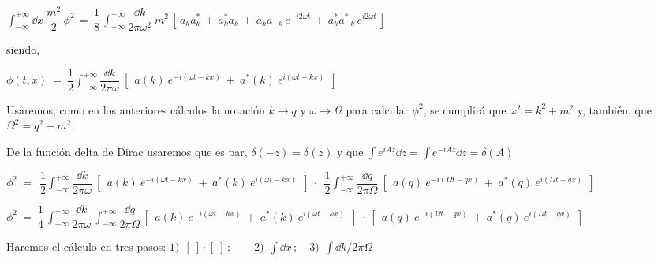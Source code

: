 {\begin{ejercicio}
\begin{adjustwidth}{30pt}{20pt}
$\displaystyle \int_{-\infty}^{+\infty} \dd x \ \dfrac {m^2} 2 \, \phi^2 \, = \,
\dfrac 1 8 \, \int_{-\infty}^{+\infty} \dfrac{\dd k}{2\pi \omega^2}\ m^2 \, 
\left[\,
a_ka^*_k \, + \, a^*_k a_k \, + \, a_ka_{-k}\, e^{-i2\omega t}\, + \, a^*_ka^*_{-k}\, e^{i2\omega t}
\, \right]$

siendo,

$\displaystyle \phi(t,x) \ = \ \dfrac 1 2   \int_{-\infty}^{+\infty} 
\dfrac{\dd k}{2\pi \omega} \ \left[ \ 
\  a(k)\ e^{-i(\omega t-kx)} \ + \ a^*(k)\ e^{i(\omega t-kx)} \  \ \right] $
\vspace{2mm}
\end{adjustwidth}
\end{ejercicio}

\vspace{5mm}
\color{MidnightBlue}

Usaremos, como en los anteriores cálculos la notación $k \to q$ y $\omega \to \Omega$ para calcular $\phi^2$, se cumplirá que $\omega^2=k^2+m^2$ y, también, que  $\Omega^2=q^2+m^2$. 

De la función delta de Dirac usaremos que es par, $\delta(-z)=\delta(z)$ y que $\displaystyle \int e^{iAz}\dd z=\int e^{-iAz}\dd z=\delta(A)$

\begin{footnotesize}
$\displaystyle \phi^2 \ = \ \ \dfrac 1 2   \int_{-\infty}^{+\infty} 
\dfrac{\dd k}{2\pi \omega} \ \left[ \ 
\  a(k)\ e^{-i(\omega t-kx)} \ + \ a^*(k)\ e^{i(\omega t-kx)} \  \ \right] \ \cdot \ 
\ \dfrac 1 2   \int_{-\infty}^{+\infty} 
\dfrac{\dd q}{2\pi \Omega} \ \left[ \ 
\  a(q)\ e^{-i(\Omega t-qx)} \ + \ a^*(q)\ e^{i(\Omega t-qx)} \  \ \right]$

$\displaystyle  \phi^2 \ = \ \dfrac 1 4\, 
\int_{-\infty}^{+\infty} \dfrac{\dd k}{2\pi \omega} \,  \int_{-\infty}^{+\infty}  \dfrac{\dd q}{2\pi \Omega} \, 
\left[ \ 
\  a(k)\ e^{-i(\omega t-kx)} \ + \ a^*(k)\ e^{i(\omega t-kx)} \  \ \right] \ \cdot \  \left[ \ 
\  a(q)\ e^{-i(\Omega t-qx)} \ + \ a^*(q)\ e^{i(\Omega t-qx)} \  \ \right]$
\end{footnotesize}
 
\vspace{5mm}
Haremos el cálculo en tres pasos: $1)\ \ [\ ]\cdot [\ ]\,;\qquad 2)\ \ \int \dd x\, ; \quad 3)\ \ \int \dd k/2\pi \Omega $

}
